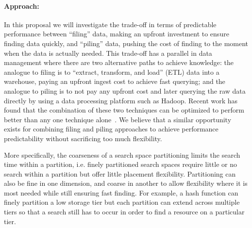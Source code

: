 \paragraph{Approach:} 
In this proposal we will investigate the trade-off in terms of predictable performance between 
``filing'' data, making an upfront investment to ensure finding data quickly, and ``piling'' 
data, pushing the cost of finding to the moment when the data is actually needed. This trade-off 
has a parallel in data management where there are two alternative paths to achieve knowledge: 
the analogue to filing is  to ``extract, transform, and load'' (ETL) data into a warehouse, paying 
an upfront ingest cost to achieve fast querying; and the analogue to piling is to not pay any upfront 
cost and later querying   the raw data directly by using a data processing platform such as Hadoop.  Recent work 
has found that the combination of these two techniques can be optimized to perform better than 
any one technique alone~\cite{lefevre:sigmod14a}. We believe that a similar opportunity exists 
for combining filing and piling approaches to achieve performance predictability without sacrificing 
too much flexibility.

More specifically, the coarseness of a search space partitioning limits the search time within 
a partition, i.e. finely partitioned search spaces require little or no search within a partition 
but offer little placement flexibility. Partitioning can also be fine in one dimension, and coarse 
in another to allow flexibility where it is most needed while still ensuring fast finding. For 
example, a hash function can finely partition a low storage tier but each partition can extend 
across multiple tiers so that a search still has to occur in order to find a resource on a particular 
tier.  


